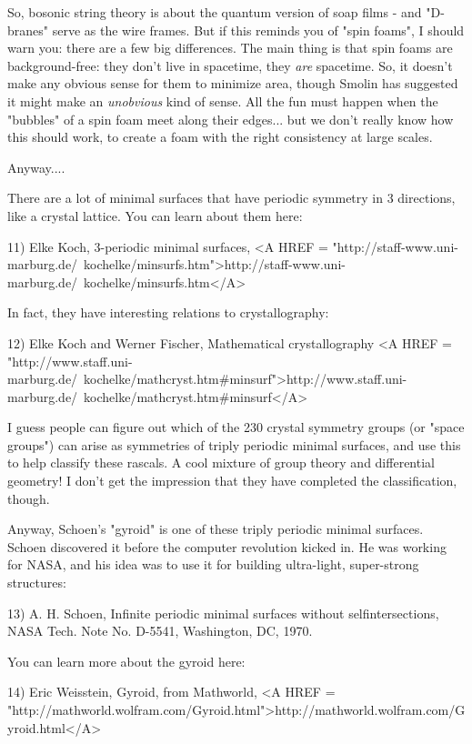 So, bosonic string theory is about the quantum version of soap films -
and "D-branes" serve as the wire frames.  But if this reminds you of "spin 
foams", I should warn you: there are a few big differences.  The main 
thing is that spin foams are background-free: they don't live in spacetime, 
they 
\emph{are} spacetime.  So, it doesn't make any obvious sense for them to 
minimize area, though Smolin has suggested it might make an \emph{unobvious}
kind of sense.  All the fun must happen when the "bubbles" of a spin 
foam meet along their edges... but we don't really know how this should work, 
to create a foam with the right consistency at large scales.  

Anyway....

There are a lot of minimal surfaces that have periodic symmetry in
3 directions, like a crystal lattice.  You can learn about them here:

11) Elke Koch, 3-periodic minimal surfaces, 
<A HREF = "http://staff-www.uni-marburg.de/~kochelke/minsurfs.htm">http://staff-www.uni-marburg.de/~kochelke/minsurfs.htm</A>

In fact, they have interesting relations to crystallography: 

12) Elke Koch and Werner Fischer, Mathematical crystallography
<A HREF = "http://www.staff.uni-marburg.de/~kochelke/mathcryst.htm#minsurf">http://www.staff.uni-marburg.de/~kochelke/mathcryst.htm#minsurf</A>

I guess people can figure out which of the 230 crystal symmetry groups 
(or "space groups") can arise as symmetries of triply 
periodic minimal 
surfaces, and use this to help classify these rascals.  A cool mixture 
of group theory and differential geometry!  I don't get the impression 
that they have completed the classification, though.  

Anyway, Schoen's "gyroid" is one of these triply periodic minimal 
surfaces.  Schoen discovered it before the computer revolution kicked 
in.  He was working for NASA, and his idea was to use it for building
ultra-light, super-strong structures:

13) A. H. Schoen, Infinite periodic minimal surfaces without 
selfintersections, NASA Tech. Note No. D-5541, Washington, DC, 1970.

You can learn more about the gyroid here:

14) Eric Weisstein, Gyroid, from Mathworld,
<A HREF = "http://mathworld.wolfram.com/Gyroid.html">http://mathworld.wolfram.com/Gyroid.html</A>

